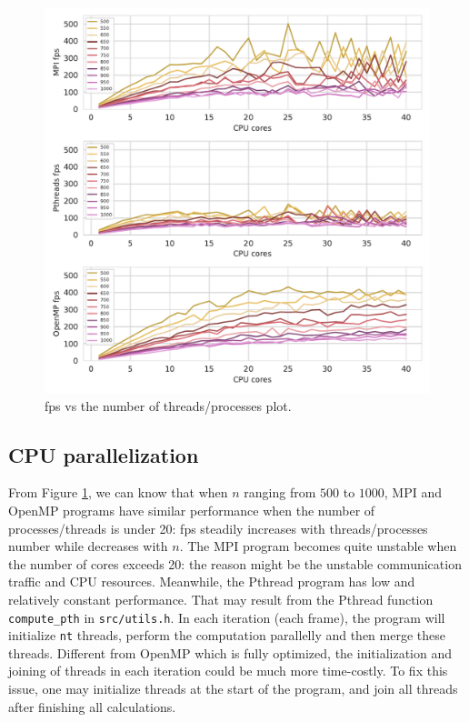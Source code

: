 \documentclass[twoside,12pt]{article}
\theoremstyle{definition}
\theoremstyle{remark}
\begin{document}
\begin{figure}[h!]
    \centering
    \includegraphics[width=\textwidth]{../analysis/fps-core-cpu.pdf}
    \caption{fps vs the number of threads/processes plot.}
    \label{fig:fps-core-cpu}
\end{figure}

\subsection{CPU parallelization}
From Figure \ref{fig:fps-core-cpu}, we can know that
when $n$ ranging from $500$ to $1000$,
MPI and OpenMP programs have similar performance when the number of processes/threads is under 20: 
fps steadily increases with threads/processes number while decreases with $n$.
The MPI program becomes quite unstable when the number of cores exceeds 20:
the reason might be the unstable communication traffic and CPU resources. 
Meanwhile, the Pthread program has low and relatively constant performance.
That may result from the Pthread function \lstinline|compute_pth| in
\lstinline|src/utils.h|.
In each iteration (each frame), the program will initialize \lstinline|nt|
threads, perform the computation parallelly and then merge these threads.
Different from OpenMP which is fully optimized, the initialization and
joining of threads in each iteration could be much more time-costly.
To fix this issue, one may initialize threads at the start of the program,
and join all threads after finishing all calculations.
\end{document}
